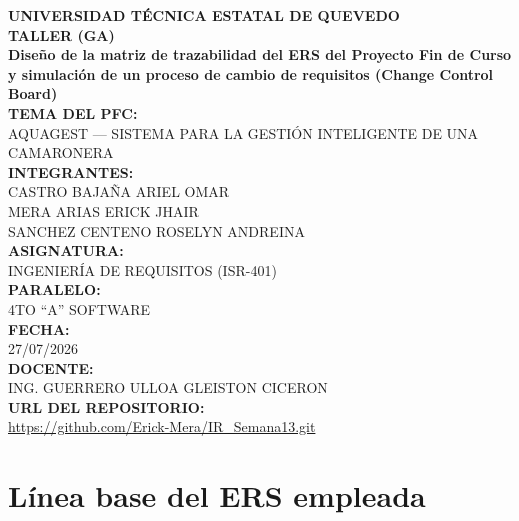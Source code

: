 \documentclass[11pt,a4paper]{article}
\begin{document}
\begin{titlepage}
\centering
\textbf{\large UNIVERSIDAD TÉCNICA ESTATAL DE QUEVEDO}\\[2cm]


\textbf{TALLER (GA)}\\[0.2cm]
\textbf{Diseño de la matriz de trazabilidad del ERS del Proyecto Fin de Curso\\
y simulación de un proceso de cambio de requisitos (Change Control Board)}\\[0.8cm]

\textbf{TEMA DEL PFC:}\\[0.2cm]
AQUAGEST — SISTEMA PARA LA GESTIÓN INTELIGENTE DE UNA CAMARONERA\\[0.8cm]

\textbf{INTEGRANTES:}\\[0.3cm]
CASTRO BAJAÑA ARIEL OMAR\\[0.3cm]
MERA ARIAS ERICK JHAIR\\[0.3cm]
SANCHEZ CENTENO ROSELYN ANDREINA\\[0.8cm]

\textbf{ASIGNATURA:}\\[0.2cm]
INGENIERÍA DE REQUISITOS (ISR-401)\\[0.5cm]

\textbf{PARALELO:}\\[0.2cm]
4TO ``A'' SOFTWARE\\[0.5cm]

\textbf{FECHA:}\\[0.2cm]
27/07/2026\\[0.5cm]

\textbf{DOCENTE:}\\[0.2cm]
ING. GUERRERO ULLOA GLEISTON CICERON\\[0.8cm]

\textbf{URL DEL REPOSITORIO:}\\[0.2cm]
\url{https://github.com/Erick-Mera/IR_Semana13.git}
\end{titlepage}

\newpage
\tableofcontents
\newpage

\section{Línea base del ERS empleada}
\end{document}
